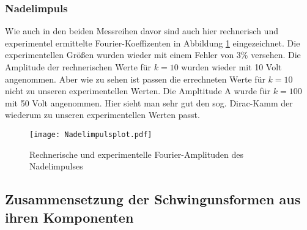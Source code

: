\subsubsection{Nadelimpuls}
Wie auch in den beiden Messreihen davor sind auch hier rechnerisch und experimentel
ermittelte Fourier-Koeffizenten in Abbildung \ref{fig:np} eingezeichnet. Die experimentellen
Größen wurden wieder mit einem Fehler von 3\% versehen. Die Amplitude der rechnerischen Werte
für $ k = 10$ wurden wieder mit 10 Volt angenommen. Aber wie zu sehen ist passen die errechneten
Werte für $k = 10$ nicht zu unseren experimentellen Werten. Die Ampltitude A wurde für $k = 100$
mit 50 Volt angenommen. Hier sieht man sehr gut den sog. Dirac-Kamm der wiederum zu unseren
experimentellen Werten passt.
\begin{figure}
  \centering
  \texttt{[image: Nadelimpulsplot.pdf]}
  \caption{Rechnerische und experimentelle Fourier-Amplituden des Nadelimpulses}
  \label{fig:np}
\end{figure}
\FloatBarrier


\subsection{Zusammensetzung der Schwingunsformen aus ihren Komponenten}
